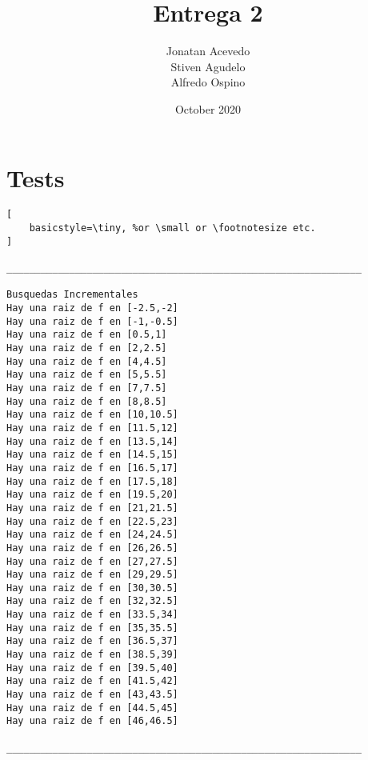 \documentclass{article}
\title{Entrega 2}
\author{Jonatan Acevedo\\Stiven Agudelo\\Alfredo Ospino}
\date{October 2020}
\begin{document}
\maketitle

\section{Tests}
\begin{lstlisting}[
    basicstyle=\tiny, %or \small or \footnotesize etc.
]

______________________________________________________________

Busquedas Incrementales
Hay una raiz de f en [-2.5,-2]
Hay una raiz de f en [-1,-0.5]
Hay una raiz de f en [0.5,1]
Hay una raiz de f en [2,2.5]
Hay una raiz de f en [4,4.5]
Hay una raiz de f en [5,5.5]
Hay una raiz de f en [7,7.5]
Hay una raiz de f en [8,8.5]
Hay una raiz de f en [10,10.5]
Hay una raiz de f en [11.5,12]
Hay una raiz de f en [13.5,14]
Hay una raiz de f en [14.5,15]
Hay una raiz de f en [16.5,17]
Hay una raiz de f en [17.5,18]
Hay una raiz de f en [19.5,20]
Hay una raiz de f en [21,21.5]
Hay una raiz de f en [22.5,23]
Hay una raiz de f en [24,24.5]
Hay una raiz de f en [26,26.5]
Hay una raiz de f en [27,27.5]
Hay una raiz de f en [29,29.5]
Hay una raiz de f en [30,30.5]
Hay una raiz de f en [32,32.5]
Hay una raiz de f en [33.5,34]
Hay una raiz de f en [35,35.5]
Hay una raiz de f en [36.5,37]
Hay una raiz de f en [38.5,39]
Hay una raiz de f en [39.5,40]
Hay una raiz de f en [41.5,42]
Hay una raiz de f en [43,43.5]
Hay una raiz de f en [44.5,45]
Hay una raiz de f en [46,46.5]

______________________________________________________________


\end{lstlisting}
\end{document}
